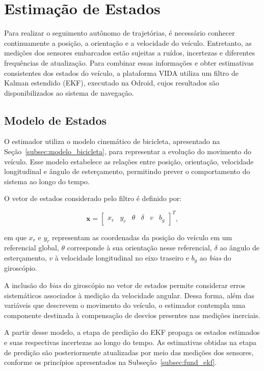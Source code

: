 
\section{Estimação de Estados}
\label{sec:estimacao}

Para realizar o seguimento autônomo de trajetórias, é necessário conhecer continuamente a posição, a orientação e a velocidade do veículo. Entretanto, as medições dos sensores embarcados estão sujeitas a ruídos, incertezas e diferentes frequências de atualização. Para combinar essas informações e obter estimativas consistentes dos estados do veículo, a plataforma VIDA utiliza um filtro de Kalman estendido (EKF), executado na Odroid, cujos resultados são disponibilizados ao sistema de navegação.

\subsection{Modelo de Estados}
\label{subsec:modelo_estados}

O estimador utiliza o modelo cinemático de bicicleta, apresentado na Seção~\ref{subsec:modelo_bicicleta}, para representar a evolução do movimento do veículo. Esse modelo estabelece as relações entre posição, orientação, velocidade longitudinal e ângulo de esterçamento, permitindo prever o comportamento do sistema ao longo do tempo.

O vetor de estados considerado pelo filtro é definido por:

\begin{equation}
\mathbf{x} =
\begin{bmatrix}
x_r & y_r & \theta & \delta & v & b_g
\end{bmatrix}^{T},
\label{eq:vetor_estados_ekf}
\end{equation}

em que $x_r$ e $y_r$ representam as coordenadas da posição do veículo em um referencial global, $\theta$ corresponde à sua orientação nesse referencial, $\delta$ ao ângulo de esterçamento, $v$ à velocidade longitudinal no eixo traseiro e $b_g$ ao \textit{bias} do giroscópio.

A inclusão do \textit{bias} do giroscópio no vetor de estados permite considerar erros sistemáticos associados à medição da velocidade angular. Dessa forma, além das variáveis que descrevem o movimento do veículo, o estimador contempla uma componente destinada à compensação de desvios presentes nas medições inerciais.

A partir desse modelo, a etapa de predição do EKF propaga os estados estimados e suas respectivas incertezas ao longo do tempo. As estimativas obtidas na etapa de predição são posteriormente atualizadas por meio das medições dos sensores, conforme os princípios apresentados na Subseção~\ref{subsec:fund_ekf}.

